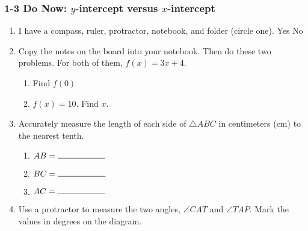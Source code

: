 \documentclass[12pt, twoside]{article}
\begin{document}
\subsubsection*{1-3 Do Now: $y$-intercept versus $x$-intercept}
  \begin{enumerate}
  \item I have a compass, ruler, protractor, notebook, and folder (circle one). Yes \qquad No

  \item Copy the notes on the board into your notebook. Then do these two problems. For both of them, $f(x)=3x+4$.
  \begin{multicols}{2}
    \begin{enumerate}
      \item Find $f(0)$ \vspace{6cm}
      \item   $f(x)=10$. Find $x$. \vspace{6cm}
    \end{enumerate}
  \end{multicols}
    \vspace{9cm}

    \item Accurately measure the length of each side of $\triangle ABC$ in centimeters (cm) to the nearest tenth.
    \bigskip
  \begin{enumerate}
    \item $AB=\rule{2cm}{0.15mm}$ \bigskip
    \item $BC=\rule{2cm}{0.15mm}$ \bigskip
    \item $AC=\rule{2cm}{0.15mm}$
  \end{enumerate}
  \begin{center}
  \end{center}

\newpage

\item Use a protractor to measure the two angles, $\angle CAT$ and $\angle TAP$. Mark the values in degrees on the diagram.
\vspace{1cm}
\begin{center}
\end{center}


\end{enumerate}
\end{document}
